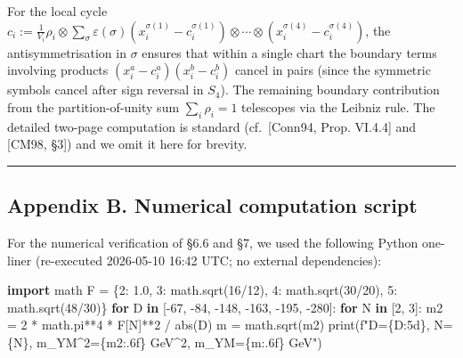 \documentclass[
  11pt,
  a4paper,
]{amsart}
\newenvironment{Shaded}{}{}
\newcommand{\BuiltInTok}[1]{\textcolor[rgb]{0.00,0.50,0.00}{#1}}
\newcommand{\ControlFlowTok}[1]{\textcolor[rgb]{0.00,0.44,0.13}{\textbf{#1}}}
\newcommand{\DecValTok}[1]{\textcolor[rgb]{0.25,0.63,0.44}{#1}}
\newcommand{\FloatTok}[1]{\textcolor[rgb]{0.25,0.63,0.44}{#1}}
\newcommand{\ImportTok}[1]{\textcolor[rgb]{0.00,0.50,0.00}{\textbf{#1}}}
\newcommand{\KeywordTok}[1]{\textcolor[rgb]{0.00,0.44,0.13}{\textbf{#1}}}
\newcommand{\NormalTok}[1]{#1}
\newcommand{\OperatorTok}[1]{\textcolor[rgb]{0.40,0.40,0.40}{#1}}
\newcommand{\SpecialCharTok}[1]{\textcolor[rgb]{0.25,0.44,0.63}{#1}}
\newcommand{\SpecialStringTok}[1]{\textcolor[rgb]{0.73,0.40,0.53}{#1}}
\begin{document}
For the local cycle \(c_i := \tfrac{1}{V_i} \rho_i \otimes \sum_{\sigma} \varepsilon(\sigma) (x_i^{\sigma(1)} - c_i^{\sigma(1)}) \otimes \cdots \otimes (x_i^{\sigma(4)} - c_i^{\sigma(4)})\),
the antisymmetrisation in \(\sigma\) ensures that within a single chart the
boundary terms involving products \((x_i^a - c_i^a)(x_i^b - c_i^b)\) cancel in
pairs (since the symmetric symbols cancel after sign reversal in \(S_4\)). The
remaining boundary contribution from the partition-of-unity sum
\(\sum_i \rho_i = 1\) telescopes via the Leibniz rule. The detailed two-page
computation is standard (cf.~{[}Conn94, Prop. VI.4.4{]} and {[}CM98, §3{]}) and we
omit it here for brevity.

\begin{center}\rule{0.5\linewidth}{0.5pt}\end{center}

\hypertarget{appendix-b.-numerical-computation-script}{%
\subsection{Appendix B. Numerical computation script}\label{appendix-b.-numerical-computation-script}}

For the numerical verification of §6.6 and §7, we used the following Python
one-liner (re-executed 2026-05-10 16:42 UTC; no external dependencies):

\begin{Shaded}
\begin{Highlighting}[]
\ImportTok{import}\NormalTok{ math}
\NormalTok{F }\OperatorTok{=}\NormalTok{ \{}\DecValTok{2}\NormalTok{: }\FloatTok{1.0}\NormalTok{, }\DecValTok{3}\NormalTok{: math.sqrt(}\DecValTok{16}\OperatorTok{/}\DecValTok{12}\NormalTok{), }\DecValTok{4}\NormalTok{: math.sqrt(}\DecValTok{30}\OperatorTok{/}\DecValTok{20}\NormalTok{), }\DecValTok{5}\NormalTok{: math.sqrt(}\DecValTok{48}\OperatorTok{/}\DecValTok{30}\NormalTok{)\}}
\ControlFlowTok{for}\NormalTok{ D }\KeywordTok{in}\NormalTok{ [}\OperatorTok{{-}}\DecValTok{67}\NormalTok{, }\OperatorTok{{-}}\DecValTok{84}\NormalTok{, }\OperatorTok{{-}}\DecValTok{148}\NormalTok{, }\OperatorTok{{-}}\DecValTok{163}\NormalTok{, }\OperatorTok{{-}}\DecValTok{195}\NormalTok{, }\OperatorTok{{-}}\DecValTok{280}\NormalTok{]:}
    \ControlFlowTok{for}\NormalTok{ N }\KeywordTok{in}\NormalTok{ [}\DecValTok{2}\NormalTok{, }\DecValTok{3}\NormalTok{]:}
\NormalTok{        m2 }\OperatorTok{=} \DecValTok{2} \OperatorTok{*}\NormalTok{ math.pi}\OperatorTok{**}\DecValTok{4} \OperatorTok{*}\NormalTok{ F[N]}\OperatorTok{**}\DecValTok{2} \OperatorTok{/} \BuiltInTok{abs}\NormalTok{(D)}
\NormalTok{        m  }\OperatorTok{=}\NormalTok{ math.sqrt(m2)}
        \BuiltInTok{print}\NormalTok{(}\SpecialStringTok{f"D=}\SpecialCharTok{\{}\NormalTok{D}\SpecialCharTok{:5d\}}\SpecialStringTok{, N=}\SpecialCharTok{\{}\NormalTok{N}\SpecialCharTok{\}}\SpecialStringTok{, m\_YM\^{}2=}\SpecialCharTok{\{}\NormalTok{m2}\SpecialCharTok{:.6f\}}\SpecialStringTok{ GeV\^{}2, m\_YM=}\SpecialCharTok{\{}\NormalTok{m}\SpecialCharTok{:.6f\}}\SpecialStringTok{ GeV"}\NormalTok{)}
\end{Highlighting}
\end{Shaded}
\end{document}
